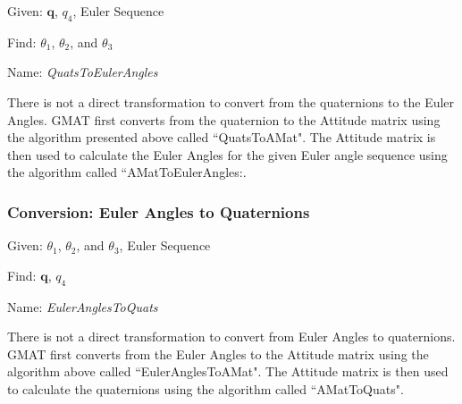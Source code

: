 \noindent Given: $\mathbf{q}$, $q_4$, Euler Sequence

\noindent Find: $\theta_1$, $\theta_2$, and $\theta_3$

\noindent Name:  \emph{QuatsToEulerAngles}

There is not a direct transformation to convert from the quaternions to the Euler
Angles.  GMAT first converts from the quaternion to the Attitude matrix using the
algorithm presented above called ``QuatsToAMat". %
The Attitude matrix is then used to
calculate the Euler Angles for the given Euler angle sequence using the algorithm
called ``AMatToEulerAngles:. %


\subsubsection{Conversion:  Euler Angles to Quaternions}

\noindent Given: $\theta_1$, $\theta_2$, and $\theta_3$, Euler
Sequence

\noindent Find: $\mathbf{q}$, $q_4$

\noindent Name:  \emph{EulerAnglesToQuats}

There is not a direct transformation to convert from Euler Angles to quaternions.
GMAT first converts from the Euler Angles to the Attitude matrix using the
algorithm above called ``EulerAnglesToAMat". %
The Attitude matrix is then used to
calculate the quaternions using the algorithm
called ``AMatToQuats". %


